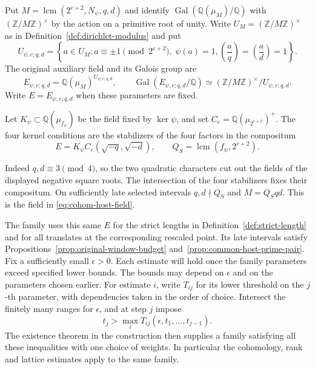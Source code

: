 \begin{definition}\label{def:family-original-host}
Put \(M=\operatorname{lcm}(2^{e+2},N_\psi,q,d)\) and identify
\(\operatorname{Gal}(\mathbb Q(\mu_M)/\mathbb Q)\) with
\((\mathbb Z/M\mathbb Z)^\times\) by the action on a primitive root of unity. Write \(U_M=(\mathbb Z/M\mathbb Z)^\times\) as in Definition~\ref{def:dirichlet-modulus} and put
\[
 U_{\psi,e;q,d}=\left\{a\in U_M:
 a\equiv\pm1\pmod{2^{e+2}},\ \psi(a)=1, \left(\frac aq\right)=\left(\frac ad\right)=1\right\}.
\]
The original auxiliary field and its Galois group are
\[
 E_{\psi,e;q,d}=\mathbb Q(\mu_M)^{U_{\psi,e;q,d}},\qquad
 \operatorname{Gal}(E_{\psi,e;q,d}/\mathbb Q)
       \simeq(\mathbb Z/M\mathbb Z)^\times/U_{\psi,e;q,d}.
\]
Write \(E=E_{\psi,e;q,d}\) when these parameters are fixed.

Let \(K_\psi\subset\mathbb Q(\mu_{f_\psi})\) be the field fixed by
\(\ker\psi\), and set \(C_e=\mathbb Q(\mu_{2^{e+2}})^+\).
The four kernel conditions are the stabilizers of the four factors
in the compositum
\begin{equation}\label{eq:host-character-compositum}
 E=K_\psi C_e(\sqrt{-q},\sqrt{-d}),\qquad
 Q_S=\operatorname{lcm}(f_\psi,2^{e+2}).
\end{equation}

Indeed \(q,d\equiv3\pmod4\), so the two quadratic characters
cut out the fields of the displayed negative square roots. The
intersection of the four stabilizers fixes their compositum.
On sufficiently late selected intervals \(q,d\nmid Q_S\) and \(M=Q_Sqd\).
This is the field in \eqref{eq:cohom-host-field}.
\end{definition}

The family uses this same \(E\) for the strict lengths in
Definition~\ref{def:strict-length} and for all translates at
the corresponding rescaled point. Its late intervals satisfy
Propositions~\ref{prop:original-window-budget}
and~\ref{prop:common-host-prime-pair}.
Fix a sufficiently small
\(\epsilon>0\). Each estimate will hold once the family parameters
exceed specified lower bounds. The bounds may depend on
\(\epsilon\) and on the parameters chosen earlier. For estimate \(i\), write \(T_{ij}\) for its lower threshold on the \(j\)-th parameter, with dependencies taken in the order of choice. Intersect the finitely many ranges for \(\epsilon\), and at step \(j\) impose
\[
 t_j>\max_i T_{ij}(\epsilon,t_1,\ldots,t_{j-1}).
\]
The existence theorem in the construction then
supplies a family satisfying all these inequalities with one
choice of weights. In particular the cohomology, rank and lattice
estimates apply to the same family.

